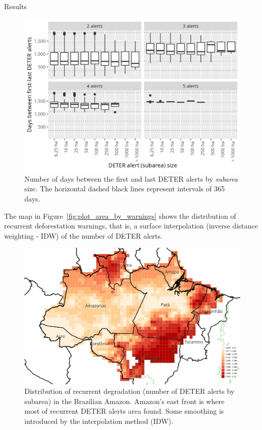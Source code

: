 \documentclass[20pt]{beamer}
\begin{document}
\begin{frame}[fragile,t]
\begin{columns}[t]
\begin{column}{0.33\linewidth}
\begin{block}{Results\vphantom{g}}
\begin{figure}[h] 
    \begin{center}
        \includegraphics[width=\linewidth]{./figures/plot_days_first_to_last.png}
        \caption{Number of days between the first and last DETER alerts by \textit{subarea} size. The horizontal dashed black lines represent intervals of 365 days.}
    \label{fig:plot_days_first_to_last}
    \end{center}
\end{figure}

        The map in Figure~\ref{fig:plot_area_by_warnings} shows the distribution of recurrent deforestation warnings, that is, a surface interpolation (inverse distance weighting - IDW) of the number of DETER alerts.

\begin{figure}[h] 
    \begin{center}
        \includegraphics[width=\linewidth]{./figures/nwarnings_idw_map_with_legend.png}
        \caption{Distribution of recurrent degradation (number of
        DETER alerts by subarea) in the Brazilian Amazon. Amazon's east front is
        where most of recurrent DETER alerts area found. Some smoothing is introduced by the interpolation method (IDW).}
    \label{fig:nwarnings_idw_map}
    \end{center}
\end{figure}


\end{block}
\end{column}
\end{columns}
\end{frame}
\end{document}
